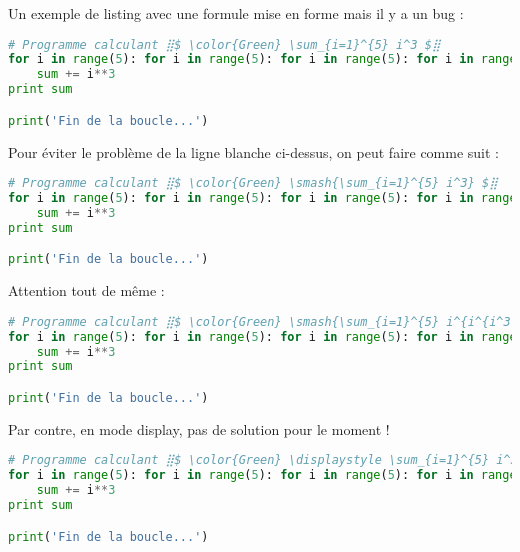 \documentclass[10pt,a4paper]{article}
\begin{document}
Un exemple de listing avec une formule mise en forme mais il y a un bug :

\begin{lstlisting}[language=Python]
# Programme calculant ⣿$ \color{Green} \sum_{i=1}^{5} i^3 $⣿
for i in range(5): for i in range(5): for i in range(5): for i in range(5): for i in range(5): for i in range(5):
    sum += i**3
print sum

print('Fin de la boucle...')
\end{lstlisting}


Pour éviter le problème de la ligne blanche ci-dessus, on peut faire comme suit :


\begin{lstlisting}[language=Python]
# Programme calculant ⣿$ \color{Green} \smash{\sum_{i=1}^{5} i^3} $⣿
for i in range(5): for i in range(5): for i in range(5): for i in range(5): for i in range(5): for i in range(5):
    sum += i**3
print sum

print('Fin de la boucle...')
\end{lstlisting}


Attention tout de même :

\begin{lstlisting}[language=Python]
# Programme calculant ⣿$ \color{Green} \smash{\sum_{i=1}^{5} i^{i^{i^3}}} $⣿
for i in range(5): for i in range(5): for i in range(5): for i in range(5): for i in range(5): for i in range(5):
    sum += i**3
print sum

print('Fin de la boucle...')
\end{lstlisting}


Par contre, en mode display, pas de solution pour le moment !

\begin{lstlisting}[language=Python]
# Programme calculant ⣿$ \color{Green} \displaystyle \sum_{i=1}^{5} i^3 $⣿
for i in range(5): for i in range(5): for i in range(5): for i in range(5): for i in range(5): for i in range(5):
    sum += i**3
print sum

print('Fin de la boucle...')
\end{lstlisting}
\end{document}

